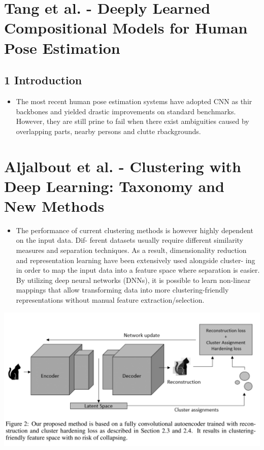 \documentclass{report}
\begin{document}
\section*{Tang et al. - Deeply Learned Compositional Models for Human Pose Estimation}
\subsection*{1 Introduction}
\begin{itemize}
    \item The most recent human pose estimation systems have adopted CNN as thir backbones and yielded drastic improvements on standard benchmarks. However, they are still prine to fail when there exist ambiguities caused by overlapping parts, nearby persons and clutte rbackgrounds.
\end{itemize}

\section*{Aljalbout et al. - Clustering with Deep Learning:
Taxonomy and New Methods}

\begin{itemize}
    \item The performance of current clustering methods is however highly dependent on the input data. Dif-
    ferent datasets usually require different similarity measures and separation techniques. As a result,
    dimensionality reduction and representation learning have been extensively used alongside cluster-
    ing in order to map the input data into a feature space where separation is easier. By utilizing deep
    neural networks (DNNs), it is possible to learn non-linear mappings that allow transforming data
    into more clustering-friendly representations without manual feature extraction/selection.
\end{itemize}
\begin{center}
    \includegraphics[height = 4 cm]{entities/Aljalbout.PNG}
\end{center}
\end{document}
